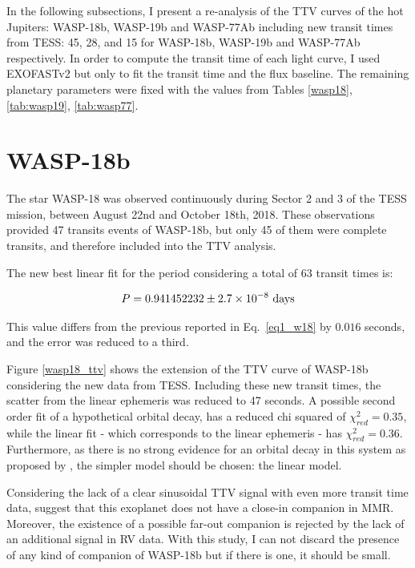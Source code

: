 In the following subsections, I present a re-analysis of the TTV curves of the hot Jupiters: WASP-18b, WASP-19b and WASP-77Ab including new transit times from TESS: 45, 28, and 15 for WASP-18b, WASP-19b and WASP-77Ab respectively. In order to compute the transit time of each light curve, I used EXOFASTv2 but only to fit the transit time and the flux baseline. The remaining planetary parameters were fixed with the values from Tables \ref{wasp18}, \ref{tab:wasp19}, \ref{tab:wasp77}.

\section{WASP-18b}

The star WASP-18 was observed continuously during Sector 2 and 3 of the TESS mission, between August 22nd and October 18th, 2018. These observations provided 47 transits events of WASP-18b, but only 45 of them were complete transits, and therefore included into the TTV analysis. 

The new best linear fit for the period considering a total of 63 transit times is:

\begin{equation}
P = 0.941452232 \pm 2.7\times10^{-8} ~\rm days
\end{equation}

This value differs from the previous reported in Eq.~\ref{eq1_w18} by $0.016$ seconds, and the error was reduced to a third.

Figure \ref{wasp18_ttv} shows the extension of the TTV curve of WASP-18b considering the new data from TESS. Including these new transit times, the scatter from the linear ephemeris was reduced to 47 seconds. A possible second order fit of a hypothetical orbital decay, has a reduced chi squared of $\chi^{2}_{red}=0.35$, while the linear fit - which corresponds to the linear ephemeris - has $\chi^{2}_{red}=0.36$. Furthermore, as there is no strong evidence for an orbital decay in this system as proposed by \cite{Wilkins2017}, the simpler model should be chosen: the linear model.

Considering the lack of a clear sinusoidal TTV signal with even more transit time data, suggest that this exoplanet does not have a close-in companion in MMR. Moreover, the existence of a possible far-out companion is rejected by the lack of an additional signal in RV data. With this study, I can not discard the presence of any kind of companion of WASP-18b but if there is one, it should be small. 


